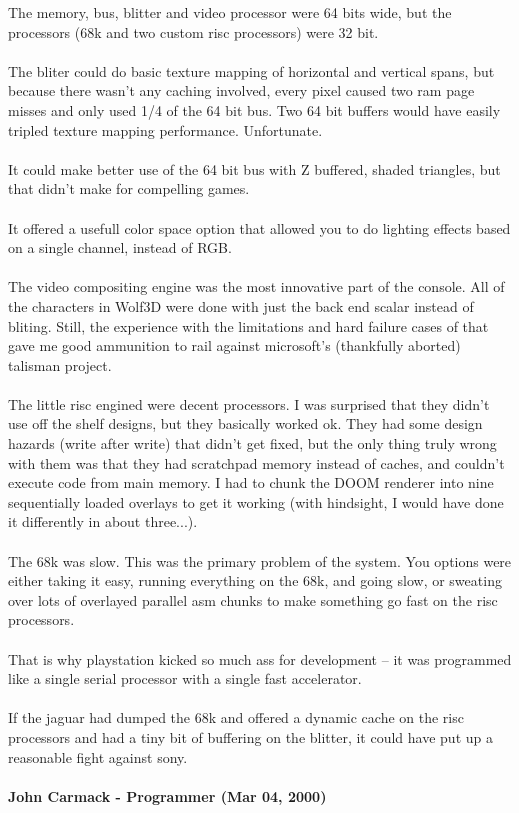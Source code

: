 \documentclass[book.tex]{subfiles}
\begin{document}
\begin{fancyquotes}
The memory, bus, blitter and video processor were 64 bits wide, but the processors (68k and two custom risc processors) were 32 bit.\\
\\
The bliter could do basic texture mapping of horizontal and vertical spans, but because there wasn't any caching involved, every pixel caused two ram page misses and only used 1/4 of the 64 bit bus. Two 64 bit buffers would have easily tripled texture mapping performance. Unfortunate.\\
\\
It could make better use of the 64 bit bus with Z buffered, shaded triangles, but that didn't make for compelling games.\\
\\
It offered a usefull color space option that allowed you to do lighting effects based on a single channel, instead of RGB.\\
\\
The video compositing engine was the most innovative part of the console. All of the characters in Wolf3D were done with just the back end scalar instead of bliting. Still, the experience with the limitations and hard failure cases of that gave me good ammunition to rail against microsoft's (thankfully aborted) talisman project.\\
\\
The little risc engined were decent processors. I was surprised that they didn't use off the shelf designs, but they basically worked ok. They had some design hazards (write after write) that didn't get fixed, but the only thing truly wrong with them was that they had scratchpad memory instead of caches, and couldn't execute code from main memory. I had to chunk the DOOM renderer into nine sequentially loaded overlays to get it working (with hindsight, I would have done it differently in about three...).\\
\\
The 68k was slow. This was the primary problem of the system. You options were either taking it easy, running everything on the 68k, and going slow, or sweating over lots of overlayed parallel asm chunks to make something go fast on the risc processors.\\
\\
That is why playstation kicked so much ass for development -- it was programmed like a single serial processor with a single fast accelerator.\\
\\
If the jaguar had dumped the 68k and offered a dynamic cache on the risc processors and had a tiny bit of buffering on the blitter, it could have put up a reasonable fight against sony.\\
\\
\textbf{John Carmack - Programmer (Mar 04, 2000)}
\end{fancyquotes}
\end{document}

